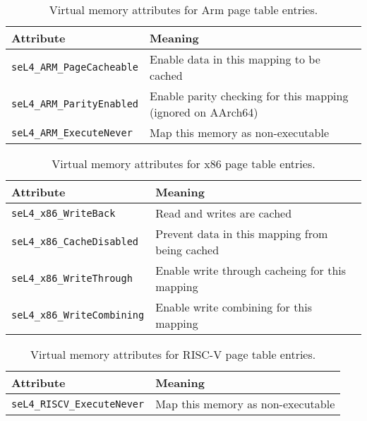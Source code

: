 \begin{table}[htb]
  \begin{center}
    \begin{tabularx}{\textwidth}{p{}X}
      \toprule
      Attribute & Meaning \\
      \midrule
      \texttt{seL4\_ARM\_PageCacheable} & Enable data in this mapping
      to be cached \\
      \texttt{seL4\_ARM\_ParityEnabled} & Enable parity checking for
      this mapping (ignored on AArch64) \\
      \texttt{seL4\_ARM\_ExecuteNever} & Map this memory as non-executable \\
      \bottomrule
    \end{tabularx}
    \caption{\label{tbl:vmattr_arm} Virtual memory attributes for Arm page
      table entries.}
  \end{center}
\end{table}

\begin{table}[htb]
  \begin{center}
    \begin{tabularx}{\textwidth}{p{}X}
      \toprule
      Attribute & Meaning \\
      \midrule
      \texttt{seL4\_x86\_WriteBack} & Read and writes are cached \\
      \texttt{seL4\_x86\_CacheDisabled} & Prevent data in this mapping
      from being cached \\
      \texttt{seL4\_x86\_WriteThrough} & Enable write through cacheing for this mapping \\
      \texttt{seL4\_x86\_WriteCombining} & Enable write combining for this mapping \\
      \bottomrule
    \end{tabularx}
    \caption{\label{tbl:vmattr_x86} Virtual memory attributes for x86 page
      table entries.}
  \end{center}
\end{table}

\begin{table}[htb]
  \begin{center}
    \begin{tabularx}{\textwidth}{p{}X}
      \toprule
      Attribute & Meaning \\
      \midrule
      \texttt{seL4\_RISCV\_ExecuteNever} & Map this memory as non-executable \\
      \bottomrule
    \end{tabularx}
    \caption{\label{tbl:vmattr_riscv} Virtual memory attributes for RISC-V page
      table entries.}
  \end{center}
\end{table}

